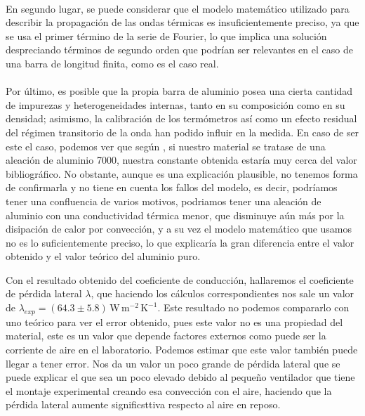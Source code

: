 \documentclass[a4paper,11pt]{article}
\begin{document}
\paragraph{}
En segundo lugar, se puede considerar que el modelo matemático utilizado para describir la propagación de las ondas térmicas es insuficientemente preciso, ya que se usa el primer término de la serie de Fourier, lo que implica una solución despreciando términos de segundo orden que podrían ser relevantes en el caso de una barra de longitud finita, como es el caso real.
\paragraph{}

Por último, es posible que la propia barra de aluminio posea una cierta cantidad de impurezas y heterogeneidades internas, tanto en su composición como en su densidad; asimismo, la calibración de los termómetros así como un efecto residual del régimen transitorio de la onda han podido influir en la medida.
En caso de ser este el caso, podemos ver que según \cite{aluminio}, si nuestro material se tratase de una aleación de aluminio 7000, nuestra constante obtenida estaría muy cerca del valor bibliográfico.
No obstante, aunque es una explicación plausible, no tenemos forma de confirmarla y no tiene en cuenta los fallos del modelo,
es decir, podríamos tener una confluencia de varios motivos, podriamos tener una aleación de aluminio con una conductividad térmica menor, que disminuye aún más
por la disipación de calor por convección, y a su vez el modelo matemático que usamos no es lo suficientemente preciso, lo que explicaría la gran diferencia entre el valor obtenido y el valor teórico del aluminio puro.

Con el resultado obtenido del coeficiente de conducción, hallaremos el coeficiente de pérdida lateral $\lambda$, que haciendo los cálculos correspondientes nos sale un valor de $\lambda_{exp} = (64.3 \pm 5.8)\,\mathrm{W\,m^{-2}\,K^{-1}}$. Este resultado no podemos compararlo con uno teórico para ver el error obtenido, pues este valor no es una propiedad del material, este es un valor que depende factores externos como puede ser la corriente de aire en el laboratorio. Podemos estimar que este valor también puede llegar a tener error. Nos da un valor un poco grande de pérdida lateral que se puede explicar el que sea un poco elevado debido al pequeño ventilador que tiene el montaje experimental creando esa convección con el aire, haciendo que la pérdida lateral aumente significsttiva respecto al aire en reposo.
\end{document}

